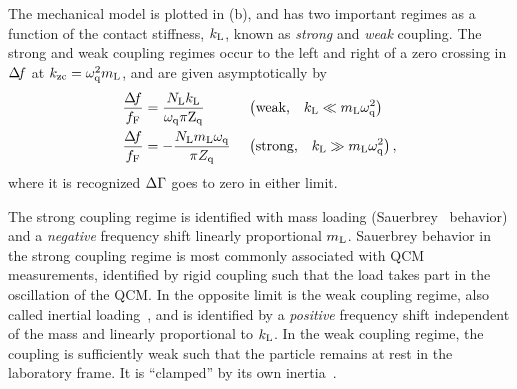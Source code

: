 The mechanical model is plotted in (b), and has
two important regimes as a function of the contact stiffness, $k_\mathrm{L}$, known
as \textit{strong} and \textit{weak} coupling.  The strong and weak
coupling regimes occur to the left and right of a zero crossing in $\Delta\!f$ at
$k_\mathrm{zc}=\omega_\mathrm{q}^2 m_\mathrm{L}$, and are given asymptotically by
\begin{align}
\frac{\Delta\!f}{f_\mathrm{F}}&= 
\frac{N_\mathrm{L} k_\mathrm{L}}
{\omega_\mathrm{q}\pi \mathrm{Z}_\mathrm{q}}
&\,&\left(\text{weak,}\quad k_\mathrm{L}\ll m_\mathrm{L}
\omega_\mathrm{q}^2\right)
\label{eqn:couplinguy1}
\\
\frac{\Delta\!f}{f_\mathrm{F}}&=  -\frac{N_\mathrm{L}
m_\mathrm{L} \omega_\mathrm{q}}{\pi Z_\mathrm{q}}
&\,&\left(\text{strong,}\quad k_\mathrm{L}\gg m_\mathrm{L}
\omega_\mathrm{q}^2\right),
\label{eqn:couplinguy2}
\end{align}
where it is recognized $\Delta\Gamma$ goes to zero in either limit.

The strong coupling regime is identified with mass loading
(Sauerbrey~\cite{sauerbrey1959verwendung} behavior) and a \textit{negative}
frequency shift linearly proportional $m_\mathrm{L}$.  Sauerbrey behavior in the
strong coupling regime is most commonly associated with QCM measurements,
identified by rigid coupling such that the load takes part in the
oscillation of the QCM.  In the opposite limit is the weak coupling regime,
also called inertial loading~\cite{dybwad1985sensitive}, and is identified
by a \textit{positive} frequency shift independent of the mass and linearly
proportional to $k_\mathrm{L}$.  In the weak coupling regime, the coupling is
sufficiently weak such that the particle remains at rest in the laboratory
frame.  It is ``clamped'' by its own inertia~\cite{du2008role}.


